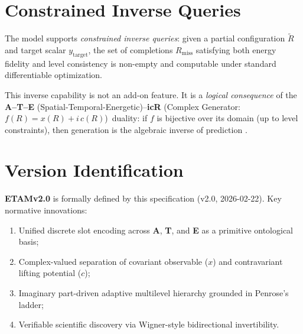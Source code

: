 \documentclass[11pt]{article}
\newcommand{\ATE}{\textbf{A--T--E} (Spatial-Temporal-Energetic)}
\newcommand{\icR}{\textbf{icR} (Complex Generator: $f(R)=x(R)+i\,c(R)$)}
\begin{document}
\section{Constrained Inverse Queries}
\label{sec:inverse-queries}
The model supports \emph{constrained inverse queries}: given a partial configuration $\tilde{R}$ and target scalar $y_{\mathrm{target}}$, the set of completions $R_{\mathrm{miss}}$ satisfying both energy fidelity and level consistency is non-empty and computable under standard differentiable optimization.

This inverse capability is not an add-on feature. It is a \emph{logical consequence} of the \ATE--\icR\ duality: if $f$ is bijective over its domain (up to level constraints), then generation is the algebraic inverse of prediction \cite{wigner1960}.

\section{Version Identification}
\label{sec:version}
\textbf{ETAMv2.0} is formally defined by this specification (v2.0, 2026-02-22). Key normative innovations:
\begin{enumerate}[leftmargin=*, nosep]
    \item Unified discrete slot encoding across \textbf{A}, \textbf{T}, and \textbf{E} as a primitive ontological basis;
    \item Complex-valued separation of covariant observable ($x$) and contravariant lifting potential ($c$);
    \item Imaginary part-driven adaptive multilevel hierarchy grounded in Penrose's ladder;
    \item Verifiable scientific discovery via Wigner-style bidirectional invertibility.
\end{enumerate}



\end{document}

